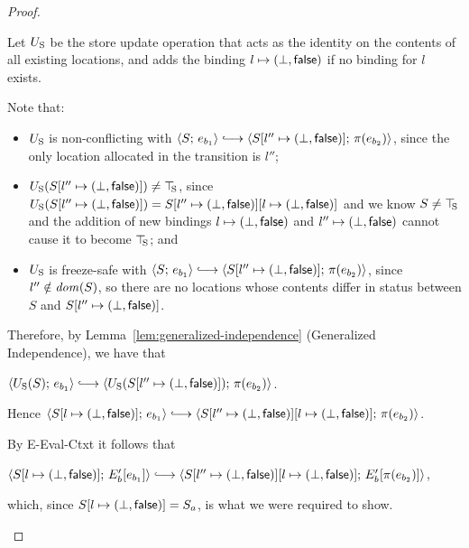 \begin{proof}
\begin{enumerate}
\begin{enumerate}
\begin{itemize}
        Let $U_{\mathrm{S}}$ be the store update operation that acts as the
        identity on the contents of all existing locations, and adds
        the binding $l \mapsto (\bot, \textsf{false})$ if no
        binding for $l$ exists.

        Note that:
        \begin{itemize}
        \item $U_{\mathrm{S}}$ is non-conflicting with $\config{S}{e_{b_1}}
          \parstepsto
          \config{\extS{S}{l''}{\bot}{\frozenfalse}}{\pi(e_{b_2})}$,
          since the only location allocated in the transition is
          $l''$;
        \item $U_{\mathrm{S}}(S[l'' \mapsto (\bot, \textsf{false})]) \neq \top\hspace{-0.85mm}_{\mathrm{S}}$,
          since $U_{\mathrm{S}}(S[l'' \mapsto (\bot, \textsf{false})]) = \\
          S[l'' \mapsto (\bot, \textsf{false})][l \mapsto (\bot, \textsf{false})]$
          and we know $S \neq \top\hspace{-0.85mm}_{\mathrm{S}}$ and the addition of new
          bindings $l \mapsto (\bot, \textsf{false})$ and
          $l'' \mapsto (\bot, \textsf{false})$ cannot cause it
          to become $\top\hspace{-0.85mm}_{\mathrm{S}}$; and
        \item $U_{\mathrm{S}}$ is freeze-safe with $\config{S}{e_{b_1}}
          \parstepsto
          \config{\extS{S}{l''}{\bot}{\frozenfalse}}{\pi(e_{b_2})}$,
          since $l'' \notin \mathit{dom}(S)$, so there are no locations
          whose contents differ in status between $S$ and
          $S[l'' \mapsto (\bot, \textsf{false})]$.
        \end{itemize}

        Therefore, by Lemma~\ref{lem:generalized-independence}
        (Generalized Independence), we have that

        $\config{\Ustore(S)}{e_{b_1}} \parstepsto
        \config{\Ustore(\extS{S}{l''}{\bot}{\frozenfalse})}{\pi(e_{b_2})}$.

        Hence $\config{\extS{S}{l}{\bot}{\frozenfalse}}{e_{b_1}}
        \parstepsto
        \config{\extS{\extS{S}{l''}{\bot}{\frozenfalse}}{l}{\bot}{\frozenfalse}}{\pi(e_{b_2})}$.

        By {\sc E-Eval-Ctxt} it follows that

        $\config{\extS{S}{l}{\bot}{\frozenfalse}}{\evalctxt{E'_b}{e_{b_1}}}
        \parstepsto
        \config{\extS{\extS{S}{l''}{\bot}{\frozenfalse}}{l}{\bot}{\frozenfalse}}{\evalctxt{E'_b}{\pi(e_{b_2})}}$,

        which, since $S[l \mapsto (\bot, \textsf{false})] = S_a$, is what
        we were required to show.


\end{itemize}
\end{enumerate}
\end{enumerate}
\end{proof}
